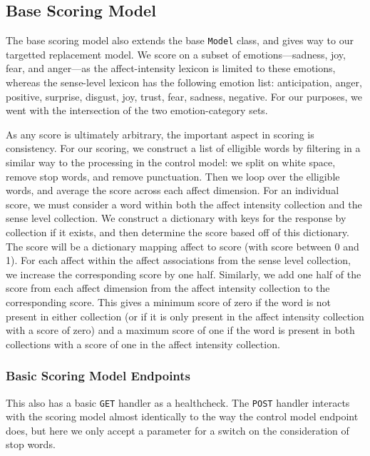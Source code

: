 \documentclass[11pt, twoside, reqno]{book}
\begin{document}
\subsection{Base Scoring Model}

The base scoring model also extends the base \texttt{Model} class, and gives way to our targetted replacement model. We score on a subset of emotions—sadness, joy, fear, and anger—as the affect-intensity lexicon is limited to these emotions, whereas the sense-level lexicon has the following emotion list: anticipation, anger, positive, surprise, disgust, joy, trust, fear, sadness, negative. For our purposes, we went with the intersection of the two emotion-category sets.

As any score is ultimately arbitrary, the important aspect in scoring is consistency. For our scoring, we construct a list of elligible words by filtering in a similar way to the processing in the control model: we split on white space, remove stop words, and remove punctuation. Then we loop over the elligible words, and average the score across each affect dimension. For an individual score, we must consider a word within both the affect intensity collection and the sense level collection. We construct a dictionary with keys for the response by collection if it exists, and then determine the score based off of this dictionary. The score will be a dictionary mapping affect to score (with score between 0 and 1). For each affect within the affect associations from the sense level collection, we increase the corresponding score by one half. Similarly, we add one half of the score from each affect dimension from the affect intensity collection to the corresponding score. This gives a minimum score of zero if the word is not present in either collection (or if it is only present in the affect intensity collection with a score of zero) and a maximum score of one if the word is present in both collections with a score of one in the affect intensity collection.

\subsubsection{\textbf{Basic Scoring Model Endpoints}}

This also has a basic \texttt{GET} handler as a healthcheck. The \texttt{POST} handler interacts with the scoring model almost identically to the way the control model endpoint does, but here we only accept a parameter for a switch on the consideration of stop words.
\end{document}
